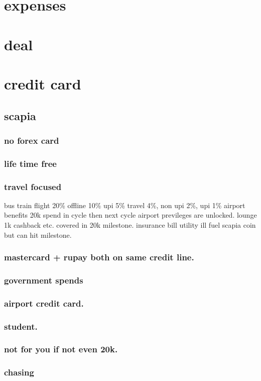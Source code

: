 \documentclass[11pt]{article}
\begin{document}
\section{expenses}
\label{sec:orgbc3c344}
\section{deal}
\label{sec:org03699d1}
\section{credit card}
\label{sec:orge557771}
\subsection{scapia}
\label{sec:org46585f8}
\subsubsection{no forex card}
\label{sec:org84547e6}
\subsubsection{life time free}
\label{sec:orgaa8f0b2}
\subsubsection{travel focused}
\label{sec:orgaf33032}
bus train flight 20\%
offline 10\%
upi 5\%
travel 4\%, non upi 2\%, upi 1\%
airport benefits 20k spend in cycle then next cycle airport previleges are unlocked. lounge 1k cashback etc.
covered in 20k milestone. insurance bill utility ill fuel scapia coin but can hit milestone.
\subsubsection{mastercard + rupay both on same credit line.}
\label{sec:org2482a19}
\subsubsection{government spends}
\label{sec:org4d4d183}
\subsubsection{airport credit card.}
\label{sec:org0164251}
\subsubsection{student.}
\label{sec:org69829f0}
\subsubsection{not for you if not even 20k.}
\label{sec:orgeb9ef4e}
\subsubsection{chasing}
\label{sec:orga9369c0}
\section{}
\label{sec:org1dc84a4}
\end{document}
